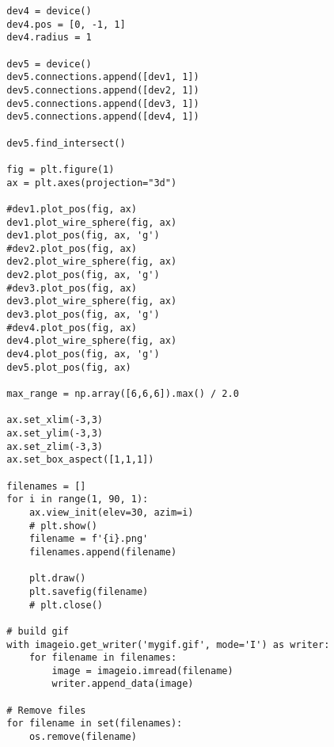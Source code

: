 \begin{lstlisting}
        dev4 = device()
        dev4.pos = [0, -1, 1]
        dev4.radius = 1
    
        dev5 = device()
        dev5.connections.append([dev1, 1])
        dev5.connections.append([dev2, 1])
        dev5.connections.append([dev3, 1])
        dev5.connections.append([dev4, 1])
    
        dev5.find_intersect()
    
        fig = plt.figure(1)
        ax = plt.axes(projection="3d")
    
        #dev1.plot_pos(fig, ax)
        dev1.plot_wire_sphere(fig, ax)
        dev1.plot_pos(fig, ax, 'g')
        #dev2.plot_pos(fig, ax)
        dev2.plot_wire_sphere(fig, ax)
        dev2.plot_pos(fig, ax, 'g')
        #dev3.plot_pos(fig, ax)
        dev3.plot_wire_sphere(fig, ax)
        dev3.plot_pos(fig, ax, 'g')
        #dev4.plot_pos(fig, ax)
        dev4.plot_wire_sphere(fig, ax)
        dev4.plot_pos(fig, ax, 'g')
        dev5.plot_pos(fig, ax)
    
        max_range = np.array([6,6,6]).max() / 2.0
    
        ax.set_xlim(-3,3)
        ax.set_ylim(-3,3)
        ax.set_zlim(-3,3)
        ax.set_box_aspect([1,1,1])
    
        filenames = []
        for i in range(1, 90, 1):
            ax.view_init(elev=30, azim=i)
            # plt.show()
            filename = f'{i}.png'
            filenames.append(filename)
    
            plt.draw()
            plt.savefig(filename)
            # plt.close()
    
        # build gif
        with imageio.get_writer('mygif.gif', mode='I') as writer:
            for filename in filenames:
                image = imageio.imread(filename)
                writer.append_data(image)
                
        # Remove files
        for filename in set(filenames):
            os.remove(filename)
            
        
    
        
\end{lstlisting}